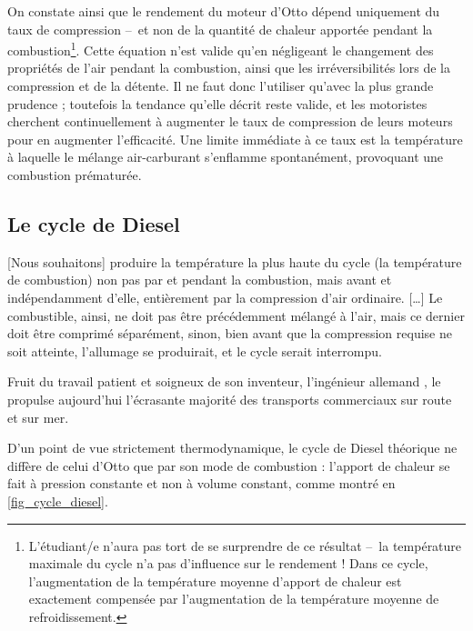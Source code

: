 		On constate ainsi que le rendement du moteur d’Otto dépend uniquement du taux de compression --\ et non de la quantité de chaleur apportée pendant la combustion\footnote{L’étudiant/e n’aura pas tort de se surprendre de ce résultat --\ la température maximale du cycle n’a pas d’influence sur le rendement ! Dans ce cycle, l’augmentation de la température moyenne d’apport de chaleur est exactement compensée par l’augmentation de la température moyenne de refroidissement.}. Cette équation n’est valide qu’en négligeant le changement des propriétés de l’air pendant la combustion, ainsi que les irréversibilités lors de la compression et de la détente. Il ne faut donc l’utiliser qu’avec la plus grande prudence ; toutefois la tendance qu’elle décrit reste valide, et les motoristes cherchent continuellement à augmenter le taux de compression de leurs moteurs pour en augmenter l’efficacité. Une limite immédiate à ce taux est la température à laquelle le mélange air-carburant s’enflamme spontanément, provoquant une combustion prématurée.

	\subsection{Le cycle de Diesel}
	\label{ch_cycle_diesel}

			[Nous souhaitons] produire la température la plus haute du cycle (la température de combustion) non pas par et pendant la combustion, mais avant et indépendamment d’elle, entièrement par la compression d’air ordinaire. […]
Le combustible, ainsi, ne doit pas être précédemment mélangé à l’air, mais ce dernier doit être comprimé séparément, sinon, bien avant que la compression requise ne soit atteinte, l’allumage se produirait, et le cycle serait interrompu.
		
		Fruit du travail patient et soigneux de son inventeur, l’ingénieur allemand , le  propulse aujourd’hui l’écrasante majorité des transports commerciaux sur route et sur mer.

		D’un point de vue strictement thermodynamique, le cycle de Diesel théorique ne diffère de celui d’Otto que par son mode de combustion : l’apport de chaleur se fait à pression constante et non à volume constant, comme montré en \cref{fig_cycle_diesel}.


